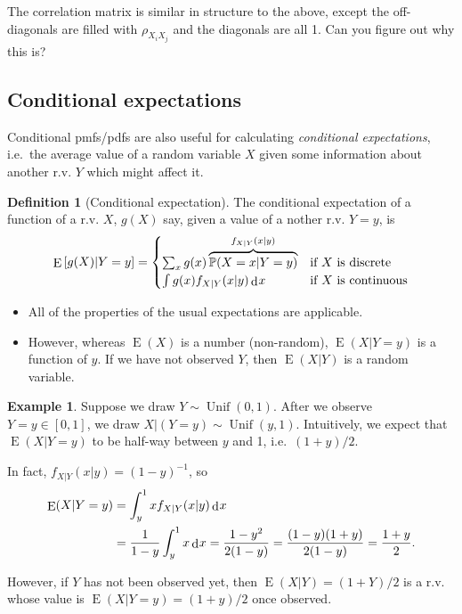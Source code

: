 \documentclass[
]{book}
\providecommand{\tightlist}{%
  \setlength{\itemsep}{0pt}\setlength{\parskip}{0pt}}
\DeclareMathOperator{\E}{E}
\DeclareMathOperator{\Unif}{Unif}
\newcommand{\bbP}{\mathbb{P}}
\DeclareMathOperator{\dd}{d}
\newcommand{\dint}{\dd\hspace{0.5pt}\!}
\theoremstyle{definition}
\newtheorem{definition}{Definition}[chapter]
\theoremstyle{definition}
\newtheorem{example}{Example}[chapter]
\theoremstyle{definition}
\theoremstyle{definition}
\theoremstyle{remark}
\begin{document}
The correlation matrix is similar in structure to the above, except the off-diagonals are filled with \(\rho_{X_iX_j}\) and the diagonals are all 1. Can you figure out why this is?

\hypertarget{conditional-expectations}{%
\subsection{Conditional expectations}\label{conditional-expectations}}

Conditional pmfs/pdfs are also useful for calculating \emph{conditional expectations}, i.e.~the average value of a random variable \(X\) given some information about another r.v. \(Y\) which might affect it.

\begin{definition}[Conditional expectation]
The conditional expectation of a function of a r.v. \(X\), \(g(X)\) say, given a value of a nother r.v. \(Y=y\), is
\[
\E\left[g(X)|Y=y\right] =
\begin{cases}
\sum_x g(x)\overbrace{\bbP(X=x|Y=y)}^{f_{X|Y}(x|y)} &\text{if $X$ is discrete}\\
\int g(x)f_{X|Y}(x|y)\dint x &\text{if $X$ is continuous}\\
\end{cases}
\]
\end{definition}

\begin{itemize}
\tightlist
\item
  All of the properties of the usual expectations are applicable.
\item
  However, whereas \(\E(X)\) is a number (non-random), \(\E(X|Y=y)\) is a function of \(y\). If we have not observed \(Y\), then \(\E(X|Y)\) is a random variable.
\end{itemize}

\begin{example}
Suppose we draw \(Y\sim\Unif(0,1)\).
After we observe \(Y=y\in[0,1]\), we draw \(X|(Y=y) \sim \Unif(y,1)\).
Intuitively, we expect that \(\E(X|Y=y)\) to be half-way between \(y\) and 1, i.e.~\((1+y)/2\).

In fact, \(f_{X|Y}(x|y) = (1-y)^{-1}\), so
\begin{align*}
\E(X|Y=y) &= \int_y^1 xf_{X|Y}(x|y) \dint x \\ &= \frac{1}{1-y} \int_y^1  x \dint x  
=\frac{1-y^2}{2(1-y)} = \frac{(1-y)(1+y)}{2(1-y)} =\frac{1+y}{2}.
\end{align*}

However, if \(Y\) has not been observed yet, then \(\E(X|Y)=(1+Y)/2\) is a r.v. whose value is \(\E(X|Y=y)=(1+y)/2\) once observed.
\end{example}
\end{document}
